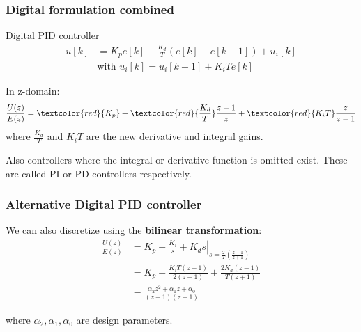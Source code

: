 \begin{frame}
	\frametitle{Digital formulation combined}
	
	
	\begin{block}{Digital PID controller}
			\begin{align*}
			u[k] &= K_p e[k] + \frac{K_d}{T}(e[k] - e[k-1])+u_i[k] \\
			&\text{with } u_i[k] = u_i[k-1] + K_i T e[k]
			\end{align*}
			
			
			In z-domain:
			\begin{equation*}
			\frac{U(z)}{E(z)} = \textcolor{red}{K_p}  + \textcolor{red}{\frac{K_d}{T}}\frac{z-1}{z} + \textcolor{red}{K_i T}\frac{z}{z-1}
			\end{equation*}
			where $\frac{K_d}{T}$ and $K_iT$  are the new derivative and integral gains.
	\end{block}
	
	 Also controllers where the integral or derivative function is omitted exist. These are called PI or PD controllers respectively.
\end{frame}

\begin{frame}
	\frametitle{Alternative Digital PID controller }
	We can also discretize using the \textbf{bilinear transformation}:
	\begin{align*}
		\frac{U(z)}{E(z)} &=  
				\left. K_p + \frac{K_i}{s} + K_d s \right|_
							{s=\frac{2}{T}\left( \frac{z-1}{z+1}\right)}  \\
			&= K_p + \frac{K_iT(z + 1)}{2(z-1)} + \frac{2K_d(z-1)}{T(z+1)} \\
			&= \frac{\alpha_2 z^2 + \alpha_1 z + \alpha_0}{(z-1)(z+1)}
	\end{align*}
	
	where $\alpha_2, \alpha_1, \alpha_0$ are design parameters.
	
\end{frame}

